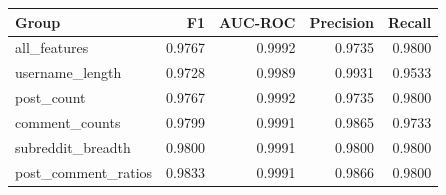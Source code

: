 \begin{tabular}{lrrrr}
\toprule
Group & F1 & AUC-ROC & Precision & Recall \\
\midrule
all_features & 0.9767 & 0.9992 & 0.9735 & 0.9800 \\
username_length & 0.9728 & 0.9989 & 0.9931 & 0.9533 \\
post_count & 0.9767 & 0.9992 & 0.9735 & 0.9800 \\
comment_counts & 0.9799 & 0.9991 & 0.9865 & 0.9733 \\
subreddit_breadth & 0.9800 & 0.9991 & 0.9800 & 0.9800 \\
post_comment_ratios & 0.9833 & 0.9991 & 0.9866 & 0.9800 \\
\bottomrule
\end{tabular}
